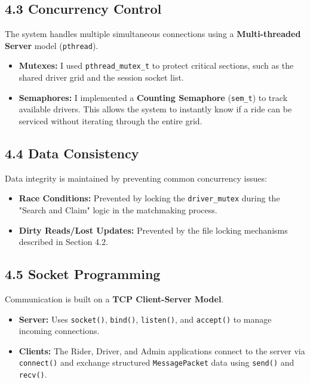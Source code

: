 \documentclass[12pt]{article}
\begin{document}
\subsection{4.3 Concurrency Control}
The system handles multiple simultaneous connections using a \textbf{Multi-threaded Server} model (\texttt{pthread}).
\begin{itemize}
    \item \textbf{Mutexes:} I used \texttt{pthread\_mutex\_t} to protect critical sections, such as the shared driver grid and the session socket list.
    \item \textbf{Semaphores:} I implemented a \textbf{Counting Semaphore} (\texttt{sem\_t}) to track available drivers. This allows the system to instantly know if a ride can be serviced without iterating through the entire grid.
\end{itemize}

\subsection{4.4 Data Consistency}
Data integrity is maintained by preventing common concurrency issues:
\begin{itemize}
    \item \textbf{Race Conditions:} Prevented by locking the \texttt{driver\_mutex} during the "Search and Claim" logic in the matchmaking process.
    \item \textbf{Dirty Reads/Lost Updates:} Prevented by the file locking mechanisms described in Section 4.2.
\end{itemize}

\subsection{4.5 Socket Programming}
Communication is built on a \textbf{TCP Client-Server Model}.
\begin{itemize}
    \item \textbf{Server:} Uses \texttt{socket()}, \texttt{bind()}, \texttt{listen()}, and \texttt{accept()} to manage incoming connections.
    \item \textbf{Clients:} The Rider, Driver, and Admin applications connect to the server via \texttt{connect()} and exchange structured \texttt{MessagePacket} data using \texttt{send()} and \texttt{recv()}.
\end{itemize}
\end{document}
